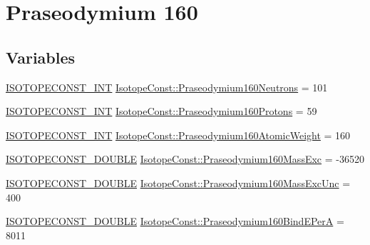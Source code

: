 \hypertarget{group___isotope_const-_praseodymium-_pr160}{}\section{Praseodymium 160}
\label{group___isotope_const-_praseodymium-_pr160}
\subsection*{Variables}
\begin{DoxyCompactItemize}
\item 
\mbox{\hyperlink{group___isotope_const-_macros_ga5f18360b3e99483a35c32d789e62621c}{I\+S\+O\+T\+O\+P\+E\+C\+O\+N\+S\+T\+\_\+\+I\+NT}} \mbox{\hyperlink{group___isotope_const-_praseodymium-_pr160_ga8a5e866884af8b716f9708f93fa9755d}{Isotope\+Const\+::\+Praseodymium160\+Neutrons}} = 101
\item 
\mbox{\hyperlink{group___isotope_const-_macros_ga5f18360b3e99483a35c32d789e62621c}{I\+S\+O\+T\+O\+P\+E\+C\+O\+N\+S\+T\+\_\+\+I\+NT}} \mbox{\hyperlink{group___isotope_const-_praseodymium-_pr160_ga66a7df52ee98278f71ef3f9a7291837f}{Isotope\+Const\+::\+Praseodymium160\+Protons}} = 59
\item 
\mbox{\hyperlink{group___isotope_const-_macros_ga5f18360b3e99483a35c32d789e62621c}{I\+S\+O\+T\+O\+P\+E\+C\+O\+N\+S\+T\+\_\+\+I\+NT}} \mbox{\hyperlink{group___isotope_const-_praseodymium-_pr160_ga7d2ad1ccd15706c652f5126b7778bdba}{Isotope\+Const\+::\+Praseodymium160\+Atomic\+Weight}} = 160
\item 
\mbox{\hyperlink{group___isotope_const-_macros_ga8f45a7272ce02c0b4c65c44636ed719a}{I\+S\+O\+T\+O\+P\+E\+C\+O\+N\+S\+T\+\_\+\+D\+O\+U\+B\+LE}} \mbox{\hyperlink{group___isotope_const-_praseodymium-_pr160_ga4b6c007b88ef044c9bd21476b5eb8b96}{Isotope\+Const\+::\+Praseodymium160\+Mass\+Exc}} = -\/36520
\item 
\mbox{\hyperlink{group___isotope_const-_macros_ga8f45a7272ce02c0b4c65c44636ed719a}{I\+S\+O\+T\+O\+P\+E\+C\+O\+N\+S\+T\+\_\+\+D\+O\+U\+B\+LE}} \mbox{\hyperlink{group___isotope_const-_praseodymium-_pr160_ga5c252d03ab2c3024e6e657be7bc512f6}{Isotope\+Const\+::\+Praseodymium160\+Mass\+Exc\+Unc}} = 400
\item 
\mbox{\hyperlink{group___isotope_const-_macros_ga8f45a7272ce02c0b4c65c44636ed719a}{I\+S\+O\+T\+O\+P\+E\+C\+O\+N\+S\+T\+\_\+\+D\+O\+U\+B\+LE}} \mbox{\hyperlink{group___isotope_const-_praseodymium-_pr160_ga70348138a3a44ce2ab48d84a3c5e2b47}{Isotope\+Const\+::\+Praseodymium160\+Bind\+E\+PerA}} = 8011

\end{DoxyCompactItemize}
